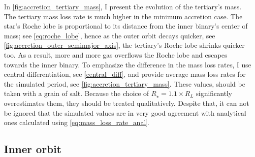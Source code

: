 In \cref{fig:accretion_tertiary_mass}, I present the evolution of the tertiary's mass. The tertiary mass loss rate is much higher in the minimum accretion case. The star's Roche lobe is proportional to its distance from the inner binary's center of mass; see \cref{eq:roche_lobe}, hence as the outer orbit decays quicker, see \cref{fig:accretion_outer_semimajor_axis}, the tertiary's Roche lobe shrinks quicker too. As a result, more and more gas overflows the Roche lobe and escapes towards the inner binary. To emphasize the difference in the mass loss rates, I use central differentiation, see \cref{central_diff}, and provide average mass loss rates for the simulated period, see \cref{fig:accretion_tertiary_mass}. These values, should be taken with a grain of salt. Because the choice of $R_{\star} = 1.1 \times R_L$ significantly overestimates them, they should be treated qualitatively. Despite that, it can not be ignored that the simulated values are in very good agreement with analytical ones calculated using \cref{eq:mass_loss_rate_anal}.


\subsection{Inner orbit}

